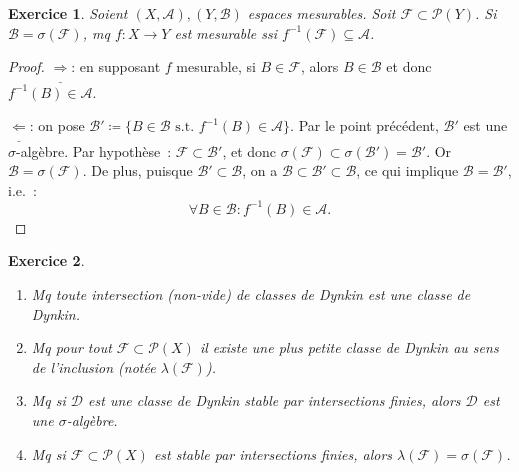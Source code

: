 \documentclass{article}
\newtheorem{ex}{Exercice}[section]
\newcommand{\st}{\text{ s.t. }}
\begin{document}
\begin{ex} Soient $(X, \mathcal A), (Y, \mathcal B)$ espaces mesurables. Soit $\mathcal F \subset \mathcal P(Y)$. Si $\mathcal B = \sigma(\mathcal F)$, mq $f : X \to Y$
est mesurable ssi $f^{-1}(\mathcal F) \subseteq \mathcal A$.
\end{ex}

\begin{proof} $\underline \Rightarrow$: en supposant $f$ mesurable, si $B \in \mathcal F$, alors $B \in \mathcal B$ et donc $f^{-1}(B) \in \mathcal A$.

$\underline \Leftarrow$: on pose $\mathcal B' \coloneqq \{B \in \mathcal B \st f^{-1}(B) \in \mathcal A\}$. Par le point précédent, $\mathcal B'$ est une $\sigma$-algèbre.
Par hypothèse~: $\mathcal F \subset \mathcal B'$, et donc $\sigma(\mathcal F) \subset \sigma(\mathcal B') = \mathcal B'$. Or $\mathcal B = \sigma(\mathcal F)$. De plus,
puisque $\mathcal B' \subset \mathcal B$, on a $\mathcal B \subset \mathcal B' \subset \mathcal B$, ce qui implique $\mathcal B = \mathcal B'$, i.e.~:
\[\forall B \in \mathcal B : f^{-1}(B) \in \mathcal A.\]
\end{proof}

\begin{ex}\label{ex:1.5}~
\begin{enumerate}
	\item Mq toute intersection (non-vide) de classes de Dynkin est une classe de Dynkin.
	\item Mq pour tout $\mathcal F \subset \mathcal P(X)$ il existe une plus petite classe de Dynkin au sens de l'inclusion (notée $\lambda(\mathcal F)$).
	\item Mq si $\mathcal D$ est une classe de Dynkin stable par intersections finies, alors $\mathcal D$ est une $\sigma$-algèbre.
	\item Mq si $\mathcal F \subset \mathcal P(X)$ est stable par intersections finies, alors $\lambda(\mathcal F) = \sigma(\mathcal F)$.
\end{enumerate}
\end{ex}
\end{document}

